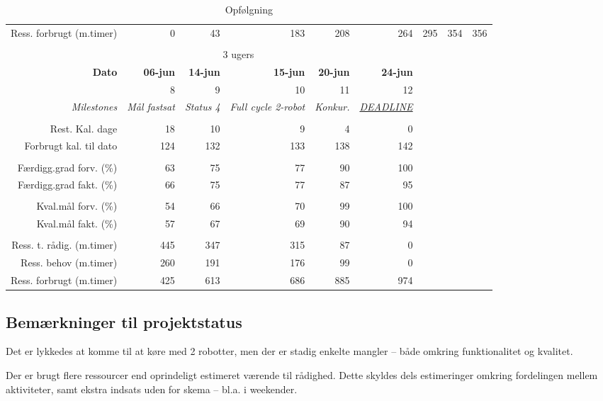 \begin{sidewaystable}[!htbp]
\begin{footnotesize}
\begin{tabular}{r|rrrrrrrr}
    Ress. forbrugt (m.timer) & 0     & 43    & 183   & 208   & 264   & 295   & 354   & 356 \\%
%
%
\\
 & \multicolumn{4}{c}{3 ugers} \\ \hline
    \textbf{Dato} & \textbf{06-jun} & \textbf{14-jun} & \textbf{15-jun} & \textbf{20-jun} & \textbf{24-jun} \\
 &       8     & 9     & 10    & 11  & 12\\
    \textit{Milestones} & \multicolumn{1}{c}{\textit{Mål fastsat}} & \multicolumn{1}{c}{\textit{Status 4}} & \multicolumn{1}{c}{\textit{Full cycle 2-robot}} & \multicolumn{1}{c}{\textit{Konkur.}} & \multicolumn{1}{c}{\textit{\underline{DEADLINE}}} \\
 & & & & & \\
    Rest. Kal. dage & 18 & 10 & 9   & 4     & 0 \\
    Forbrugt kal. til dato & 124 & 132 & 133   & 138   & 142 \\
 &       &       &     &  & & \\
    Færdigg.grad forv. (\%) & 63 & 75 & 77    & 90   & 100 \\
    Færdigg.grad fakt. (\%) & 66 & 75 & 77    & 87   & 95  \\
 &       &       &       & & \\
    Kval.mål forv. (\%) & 54    & 66 & 70  & 99  & 100 \\
    Kval.mål fakt. (\%) & 57    & 67 & 69  & 90  & 94 \\
 &       &       &     &  &  & \\
    Ress. t. rådig. (m.timer) & 445  & 347 & 315   & 87    & 0 \\
    Ress. behov (m.timer) & 260 & 191 & 176 & 99 & 0 \\
    Ress. forbrugt (m.timer) & 425 & 613 & 686 & 885      & 974
    \end{tabular}%
\end{footnotesize}
\caption{Opfølgning}\label{tab:opfolgning}
\end{sidewaystable}

\subsection{Bemærkninger til projektstatus}
Det er lykkedes at komme til at køre med 2 robotter, men der er stadig enkelte mangler -- både omkring funktionalitet og kvalitet.

Der er brugt flere ressourcer end oprindeligt estimeret værende til rådighed. Dette skyldes dels estimeringer omkring fordelingen mellem aktiviteter, samt ekstra indsats uden for skema -- bl.a. i weekender.